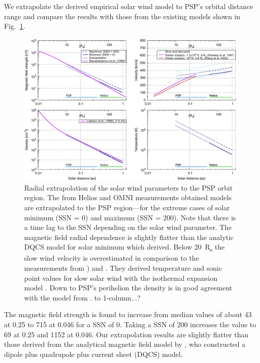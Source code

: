 We extrapolate the derived empirical solar wind model to PSP’s orbital distance range and compare the results with those from the existing models shown in Fig.~\ref{fig:sw_extrapolation_ssn_b_plot}.
\begin{figure}
	\includegraphics[width=18cm]{figures/sw_extrapolation_ssn_b_plot.pdf}
	\caption{Radial extrapolation of the solar wind parameters to the PSP orbit region. The from Helios and OMNI measurements obtained models are extrapolated to the PSP region---for the extreme cases of solar minimum (SSN = 0) and maximum (SSN = 200). Note that there is a time lag to the SSN depending on the solar wind parameter. The magnetic field radial dependence is slightly flatter than the analytic DQCS model for solar minimum which \citet{Banaszkiewicz1998} derived. Below \SI{20}{R_s} the slow wind velocity is overestimated in comparison to the measurements from \citet{Wang2000}) and \citep{Sheeley1997}. They derived temperature and sonic point values for slow solar wind with the isothermal expansion model \citep{Parker1958}. Down to PSP's perihelion the density is in good agreement with the model from \citet{Leblanc1998}. to 1-column...?}
	\label{fig:sw_extrapolation_ssn_b_plot}
\end{figure}

The magnetic field strength is found to increase from median values of about \SI{43}{\nT} at \SI{0.25}{\au} to \SI{715}{\nT} at \SI{0.046}{\au} for a SSN of 0. Taking a SSN of 200 increases the value to \SI{69}{\nT} at \SI{0.25}{\au} and \SI{1152}{\nT} at \SI{0.046}{\au}. Our extrapolation results are slightly flatter than those derived from the analytical magnetic field model by \citet{Banaszkiewicz1998}, who constructed a dipole plus quadrupole plus current sheet (DQCS) model.

